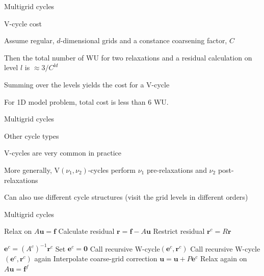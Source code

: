 \documentclass[18pt,xcolor=table]{beamer}
\begin{document}
\begin{frame}{Multigrid cycles}
\begin{block}{V-cycle cost}
\bit
\item Assume regular, $d$-dimensional grids and a constance coarsening factor, $C$
\item Then the total number of WU for two relaxations and a residual calculation on level $l$ is $\approx 3/C^{ld}$
\item Summing over the levels yields the cost for a V-cycle
\item For 1D model problem, total cost is less than 6 WU.
\eit
\end{block}
\end{frame}


\begin{frame}{Multigrid cycles}
\begin{block}{Other cycle types}
\bit
\item V-cycles are very common in practice
\item More generally, V$(\nu_1, \nu_2)$-cycles perform $\nu_1$ pre-relaxations and $\nu_2$ post-relaxations
\item Can also use different cycle structures (visit the grid levels in different orders)
\eit
\end{block}
\end{frame}

\begin{frame}{Multigrid cycles}
\begin{algorithm}[H]
\caption{Recursive W-cycle$(\mathbf{u},\mathbf{f})$}
\begin{algorithmic}
\State Relax on $A\mathbf{u} = \mathbf{f}$
\State Calculate residual $\mathbf{r} = \mathbf{f} - A\mathbf{u}$
\State Restrict residual $\mathbf{r}^c = R\mathbf{r}$

\State $\mathbf{e}^c = (A^c)^{-1}\mathbf{r}^c$
\Else
\State Set $\mathbf{e}^c = \mathbf{0}$
\State Call recursive W-cycle$(\mathbf{e}^c, \mathbf{r}^c)$
\State Call recursive W-cycle$(\mathbf{e}^c, \mathbf{r}^c)$ again
\EndIf
\State Interpolate coarse-grid correction $\mathbf{u} = \mathbf{u} + P\mathbf{e}^c$
\State Relax again on $A\mathbf{u} = \mathbf{f}^f$
\end{algorithmic}
\end{algorithm}
\end{frame}
\end{document}
